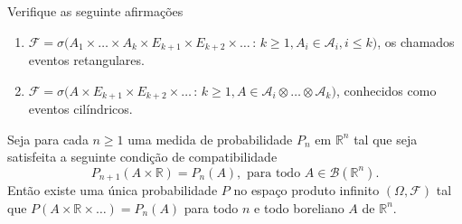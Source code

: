 \begin{exercise}
  Verifique as seguinte afirmações
  \begin{enumerate}[\quad a)]
  \item $\mathcal{F} = \sigma\big(A_1 \times \dots \times A_k \times E_{k+1} \times E_{k+2} \times \dots\, : \, k \geq 1, A_i \in \mathcal{A}_i, i \leq k\big)$,
  os chamados eventos retangulares.
  \item $\mathcal{F} = \sigma\big(A \times E_{k+1} \times E_{k+2} \times \dots\, : \, k \geq 1, A \in \mathcal{A}_i \otimes \dots \otimes \mathcal{A}_k\big)$,
  conhecidos como eventos cilíndricos.
  \end{enumerate}
\end{exercise}

\begin{theorem}
  \label{t:extens_kolmog}
  Seja para cada $n \geq 1$ uma medida de probabilidade $P_n$ em $\mathbb{R}^n$ tal que seja satisfeita a seguinte condição de compatibilidade 
  \begin{equation}
    \label{e:consist_kolmog}
    P_{n+1} (A \times \mathbb{R}) = P_n (A), \text{ para todo $A \in \mathcal{B}(\mathbb{R}^n)$}.
  \end{equation}
  Então existe uma única probabilidade $P$ no espaço produto infinito $(\Omega, \mathcal{F})$ tal que $P(A \times \mathbb{R} \times \dots) = P_n (A)$ para todo $n$ e todo boreliano $A$ de $\mathbb{R}^n$.
\end{theorem}

